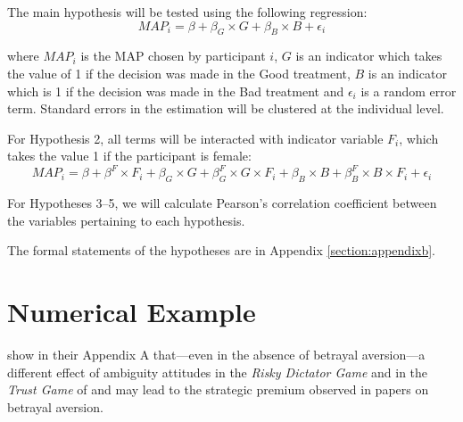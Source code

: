 The main hypothesis will be tested using the following regression:
\begin{equation} \label{eq:1}
MAP_i = \beta + \beta_G \times G + \beta_B \times B + \epsilon_i
\end{equation}

\noindent where $MAP_i$ is the MAP chosen by participant $i$, $G$ is an indicator which takes the value of 1 if the decision was made in the Good treatment, $B$ is an indicator which is 1 if the decision was made in the Bad treatment and $\epsilon_i$ is a random error term.
Standard errors in the estimation will be clustered at the individual level.

For Hypothesis 2, all terms will be interacted with indicator variable $F_i$, which takes the value 1 if the participant is female:
\begin{equation} \label{eq:2}
MAP_i = \beta + \beta^F \times F_i + \beta_G \times G + \beta_G^F \times G \times F_i + \beta_B \times B + \beta_B^F \times B \times F_i + \epsilon_i
\end{equation}

For Hypotheses 3--5, we will calculate Pearson's correlation coefficient between the variables pertaining to each hypothesis.

The formal statements of the hypotheses are in Appendix \ref{section:appendixb}.

\clearpage
\pagebreak



\clearpage
\pagebreak

\appendix
\section{Numerical Example}
\label{section:appendixa}
\setcounter{figure}{0}
\setcounter{table}{0}
\renewcommand{\thefigure}{A.\arabic{figure}}
\renewcommand{\thetable}{A.\arabic{table}}

\cite{Li2020a} show in their Appendix A that---even in the absence of betrayal aversion---a different effect of ambiguity attitudes in the \textit{Risky Dictator Game} and in the \textit{Trust Game} of \cite{Bohnet2004} and \cite{Bohnet2008} may lead to the strategic premium observed in papers on betrayal aversion.

